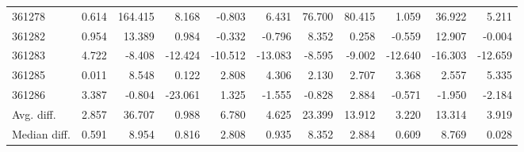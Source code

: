 \begin{tabular}{lrrrrrrrrrr}
361278 & 0.614 & 164.415 & 8.168 & -0.803 & 6.431 & 76.700 & 80.415 & 1.059 & 36.922 & 5.211 \\
361282 & 0.954 & 13.389 & 0.984 & -0.332 & -0.796 & 8.352 & 0.258 & -0.559 & 12.907 & -0.004 \\
361283 & 4.722 & -8.408 & -12.424 & -10.512 & -13.083 & -8.595 & -9.002 & -12.640 & -16.303 & -12.659 \\
361285 & 0.011 & 8.548 & 0.122 & 2.808 & 4.306 & 2.130 & 2.707 & 3.368 & 2.557 & 5.335 \\
361286 & 3.387 & -0.804 & -23.061 & 1.325 & -1.555 & -0.828 & 2.884 & -0.571 & -1.950 & -2.184 \\
Avg. diff. & 2.857 & 36.707 & 0.988 & 6.780 & 4.625 & 23.399 & 13.912 & 3.220 & 13.314 & 3.919 \\
Median diff. & 0.591 & 8.954 & 0.816 & 2.808 & 0.935 & 8.352 & 2.884 & 0.609 & 8.769 & 0.028 \\
\bottomrule
\end{tabular}
